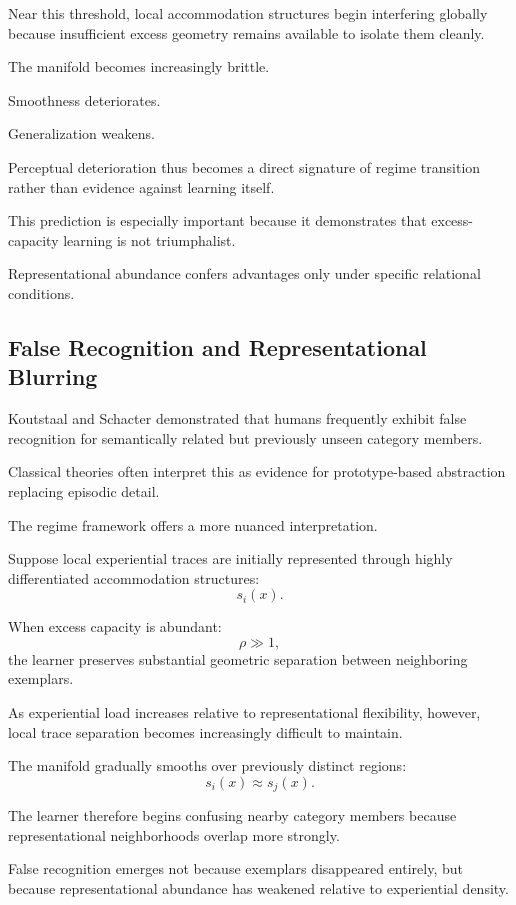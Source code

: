 \documentclass[12pt,a4paper]{article}
\begin{document}
Near this threshold, local accommodation structures begin interfering globally because insufficient excess geometry remains available to isolate them cleanly.

The manifold becomes increasingly brittle.

Smoothness deteriorates.

Generalization weakens.

Perceptual deterioration thus becomes a direct signature of regime transition rather than evidence against learning itself.

This prediction is especially important because it demonstrates that excess-capacity learning is not triumphalist.

Representational abundance confers advantages only under specific relational conditions.

\subsection{False Recognition and Representational Blurring}

Koutstaal and Schacter \cite{Koutstaal1997} demonstrated that humans frequently exhibit false recognition for semantically related but previously unseen category members.

Classical theories often interpret this as evidence for prototype-based abstraction replacing episodic detail.

The regime framework offers a more nuanced interpretation.

Suppose local experiential traces are initially represented through highly differentiated accommodation structures:
\[
s_i(x).
\]

When excess capacity is abundant:
\[
\rho \gg 1,
\]
the learner preserves substantial geometric separation between neighboring exemplars.

As experiential load increases relative to representational flexibility, however, local trace separation becomes increasingly difficult to maintain.

The manifold gradually smooths over previously distinct regions:
\[
s_i(x)
\approx
s_j(x).
\]

The learner therefore begins confusing nearby category members because representational neighborhoods overlap more strongly.

False recognition emerges not because exemplars disappeared entirely, but because representational abundance has weakened relative to experiential density.
\end{document}
